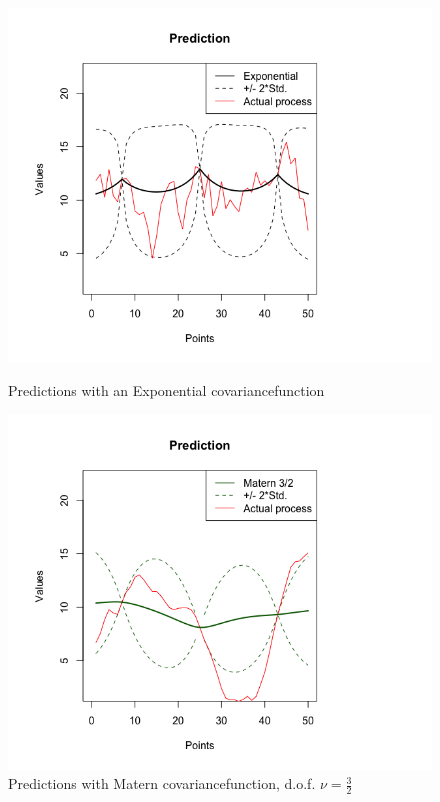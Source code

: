\begin{figure}[p]
	\includegraphics[width=1.4\linewidth]{figurer/prediction_exp5.png}
  	\caption{Predictions with an Exponential covariancefunction}	
  	\label{fig:prediction_exp5}	
	\endminipage\hfill
  \includegraphics[width=1.4\linewidth]{figurer/prediction_325.png}
	\caption{Predictions with Matern covariancefunction, d.o.f. $\nu = \frac{3}{2}$}
	\label{fig:prediction_325}
\endminipage
\end{figure}
